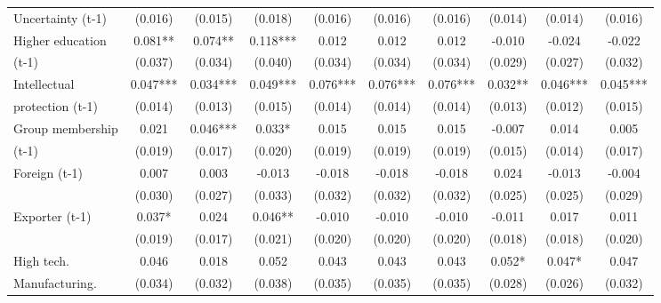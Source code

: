 \begin{table}[htbp]
\begin{tabular}{l*{9}{c}}
Uncertainty (t-1)   &     (0.016)   &     (0.015)   &     (0.018)   &     (0.016)   &     (0.016)   &     (0.016)   &     (0.014)   &     (0.014)   &     (0.016)   \\
Higher education    &       0.081** &       0.074** &       0.118***&       0.012   &       0.012   &       0.012   &      -0.010   &      -0.024   &      -0.022   \\
(t-1)               &     (0.037)   &     (0.034)   &     (0.040)   &     (0.034)   &     (0.034)   &     (0.034)   &     (0.029)   &     (0.027)   &     (0.032)   \\
Intellectual        &       0.047***&       0.034***&       0.049***&       0.076***&       0.076***&       0.076***&       0.032** &       0.046***&       0.045***\\
protection (t-1)    &     (0.014)   &     (0.013)   &     (0.015)   &     (0.014)   &     (0.014)   &     (0.014)   &     (0.013)   &     (0.012)   &     (0.015)   \\
Group membership    &       0.021   &       0.046***&       0.033*  &       0.015   &       0.015   &       0.015   &      -0.007   &       0.014   &       0.005   \\
(t-1)               &     (0.019)   &     (0.017)   &     (0.020)   &     (0.019)   &     (0.019)   &     (0.019)   &     (0.015)   &     (0.014)   &     (0.017)   \\
Foreign (t-1)       &       0.007   &       0.003   &      -0.013   &      -0.018   &      -0.018   &      -0.018   &       0.024   &      -0.013   &      -0.004   \\
                    &     (0.030)   &     (0.027)   &     (0.033)   &     (0.032)   &     (0.032)   &     (0.032)   &     (0.025)   &     (0.025)   &     (0.029)   \\
Exporter (t-1)      &       0.037*  &       0.024   &       0.046** &      -0.010   &      -0.010   &      -0.010   &      -0.011   &       0.017   &       0.011   \\
                    &     (0.019)   &     (0.017)   &     (0.021)   &     (0.020)   &     (0.020)   &     (0.020)   &     (0.018)   &     (0.018)   &     (0.020)   \\
High tech.          &       0.046   &       0.018   &       0.052   &       0.043   &       0.043   &       0.043   &       0.052*  &       0.047*  &       0.047   \\
Manufacturing.      &     (0.034)   &     (0.032)   &     (0.038)   &     (0.035)   &     (0.035)   &     (0.035)   &     (0.028)   &     (0.026)   &     (0.032)   \\

\end{tabular}
\end{table}

